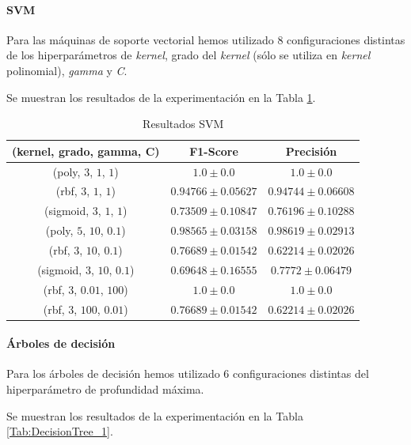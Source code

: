 \documentclass[12pt]{article}
\begin{document}
\paragraph{SVM}

Para las máquinas de soporte vectorial hemos utilizado 8 configuraciones distintas de los hiperparámetros de \textit{kernel},
grado del \textit{kernel} (sólo se utiliza en \textit{kernel} polinomial), \textit{gamma} y \textit{C}.

Se muestran los resultados de la experimentación en la Tabla \ref{Tab:SVM_1}.

\begin{table}[!ht]
	\caption{Resultados SVM}
	\centering
		\begin{tabular}{||c c c||}
		 \hline
		 (kernel, grado, gamma, C) & F1-Score & Precisión  \\ [0.5ex]
		 \hline\hline
		 (poly, $3$, $1$, $1$) & $1.0 \pm 0.0$ & $1.0 \pm 0.0$ \\
		 \hline
		 (rbf, $3$, $1$, $1$) & $0.94766 \pm 0.05627$ & $0.94744 \pm 0.06608$ \\
		 \hline
		 (sigmoid, $3$, $1$, $1$) & $0.73509 \pm 0.10847$ & $0.76196 \pm 0.10288$ \\
		 \hline
		 (poly, $5$, $10$, $0.1$) & $0.98565 \pm 0.03158$ & $0.98619 \pm 0.02913$ \\
		 \hline
		 (rbf, $3$, $10$, $0.1$) & $0.76689 \pm 0.01542$ & $0.62214 \pm 0.02026$ \\
		 \hline
		 (sigmoid, $3$, $10$, $0.1$) & $0.69648 \pm 0.16555$ & $0.7772 \pm 0.06479$ \\
		 \hline
		 (rbf, $3$, $0.01$, $100$) & $1.0 \pm 0.0$ & $1.0 \pm 0.0$ \\
		 \hline
		 (rbf, $3$, $100$, $0.01$) & $0.76689 \pm 0.01542$ & $0.62214 \pm 0.02026$ \\
		 \hline
	 \end{tabular}
	\label{Tab:SVM_1}
\end{table}

\paragraph{Árboles de decisión}
Para los árboles de decisión hemos utilizado 6 configuraciones distintas del hiperparámetro de profundidad máxima.

Se muestran los resultados de la experimentación en la Tabla \ref{Tab:DecisionTree_1}.
\end{document}
